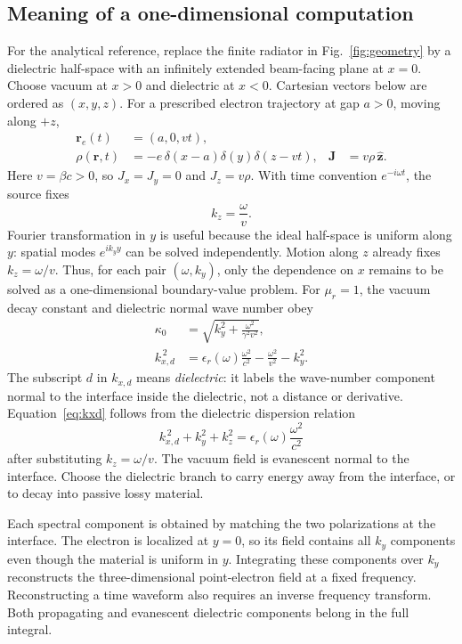 \documentclass[11pt,a4paper]{article}
\numberwithin{equation}{section}
\begin{document}
\subsection{Meaning of a one-dimensional computation}

For the analytical reference, replace the finite radiator in
Fig.~\ref{fig:geometry} by a dielectric half-space with an infinitely extended
beam-facing plane at \(x=0\). Choose vacuum at \(x>0\) and dielectric at
\(x<0\). Cartesian vectors below are ordered as \((x,y,z)\). For a prescribed
electron trajectory at gap \(a>0\), moving along \(+z\),
\begin{align}
 \mathbf r_e(t)&=(a,0,vt), \label{eq:trajectory}\\
 \rho(\mathbf r,t)&=-e\,\delta(x-a)\delta(y)\delta(z-vt),&
 \mathbf J&=v\rho\,\hat{\mathbf z}. \label{eq:source}
\end{align}
Here \(v=\beta c>0\), so \(J_x=J_y=0\) and \(J_z=v\rho\).
With time convention \(e^{-i\omega t}\), the source fixes
\begin{equation}
 k_z=\frac{\omega}{v}.
 \label{eq:phase}
\end{equation}
Fourier transformation in \(y\) is useful because the ideal half-space is
uniform along \(y\): spatial modes \(e^{ik_y y}\) can be solved independently.
Motion along \(z\) already fixes \(k_z=\omega/v\). Thus, for each pair
\((\omega,k_y)\), only the dependence on \(x\) remains to be solved as a
one-dimensional boundary-value problem. For \(\mu_r=1\), the vacuum decay
constant and dielectric normal wave number obey
\begin{align}
 \kappa_0&=\sqrt{k_y^2+\frac{\omega^2}{\gamma^2v^2}}, \label{eq:kappa}\\
 k_{x,d}^{\,2}&=\epsilon_r(\omega)\frac{\omega^2}{c^2}
                  -\frac{\omega^2}{v^2}-k_y^2. \label{eq:kxd}
\end{align}
The subscript \(d\) in \(k_{x,d}\) means \emph{dielectric}: it labels the
wave-number component normal to the interface inside the dielectric,
not a distance or derivative. Equation~\eqref{eq:kxd} follows from the
dielectric dispersion relation
\[
 k_{x,d}^{\,2}+k_y^2+k_z^2
 =\epsilon_r(\omega)\frac{\omega^2}{c^2}
\]
after substituting \(k_z=\omega/v\).
The vacuum field is evanescent normal to the interface. Choose the
dielectric branch to carry energy away from the interface, or to decay
into passive lossy material.

Each spectral component is obtained by matching the two polarizations
at the interface. The electron is localized at \(y=0\), so its field
contains all \(k_y\) components even though the material is uniform in
\(y\). Integrating these components over \(k_y\) reconstructs the
three-dimensional point-electron field at a fixed frequency. Reconstructing
a time waveform also requires an inverse frequency transform. Both
propagating and evanescent dielectric components belong in the full integral.
\end{document}
